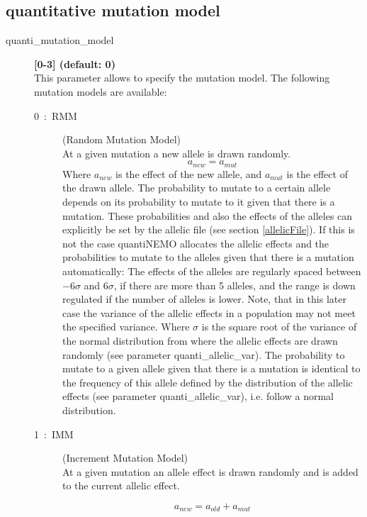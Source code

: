 \documentclass[letterpaper,12pt,oneside]{book}
\begin{document}
\subsection{quantitative mutation model}
\begin{description}
\item[quanti\_mutation\_model] \textbf{[0-3] (default: 0)}\\
This parameter allows to specify the mutation model. The following mutation models are available:
\begin{description}

\item[0~:~RMM] (Random Mutation Model)\\
At a given mutation a new allele is drawn randomly. 
	\[ a_{new} = a_{mut}    \]
Where $a_{new}$ is the effect of the new allele, and $a_{mut}$ is the effect of the drawn allele. The probability to mutate to a certain allele depends on its probability to mutate to it given that there is a mutation. These probabilities and also the effects of the alleles can explicitly be set by the allelic file (see section \ref{allelicFile}). If this is not the case quantiNEMO allocates the allelic effects and the probabilities to mutate to the alleles given that there is a mutation automatically: The effects of the alleles are regularly spaced between $-6\sigma$ and $6\sigma$, if there are more than 5 alleles, and the range is down regulated if the number of alleles is lower. Note, that in this later case the variance of the allelic effects in a population may not meet the specified variance.  Where $\sigma$ is the square root of the variance of the normal distribution from where the allelic effects are drawn randomly (see parameter \textsf{quanti\_allelic\_var}). The probability to mutate to a given allele given that there is a mutation is identical to the frequency of this allele defined by the distribution of the allelic effects (see parameter \textsf{quanti\_allelic\_var}), i.e. follow a normal distribution.

\item[1~:~IMM] (Increment Mutation Model)\\
At a given mutation an allele effect is drawn randomly and is added to the current allelic effect. 

\[ a_{new} = a_{old} + a_{mut}    \]


\end{description}
\end{description}
\end{document}
